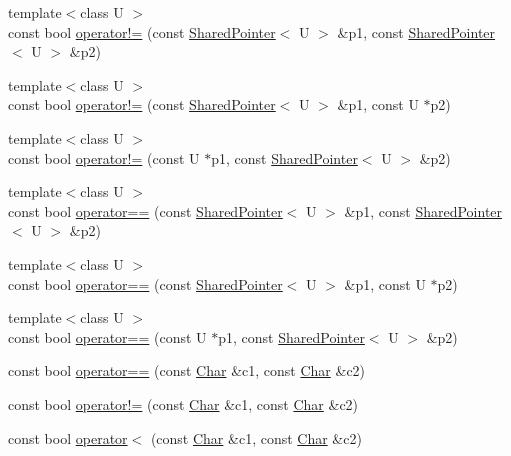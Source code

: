 \begin{DoxyCompactItemize}
\item 
{\footnotesize template$<$class U $>$ }\\const bool \hyperlink{namespaceprism_a9df924e4deb059bf1200701c8235410a}{operator!=} (const \hyperlink{classprism_1_1_shared_pointer}{Shared\+Pointer}$<$ U $>$ \&p1, const \hyperlink{classprism_1_1_shared_pointer}{Shared\+Pointer}$<$ U $>$ \&p2)
\item 
{\footnotesize template$<$class U $>$ }\\const bool \hyperlink{namespaceprism_ad6391c124e006b0e3a3ec67f55e208b0}{operator!=} (const \hyperlink{classprism_1_1_shared_pointer}{Shared\+Pointer}$<$ U $>$ \&p1, const U $\ast$p2)
\item 
{\footnotesize template$<$class U $>$ }\\const bool \hyperlink{namespaceprism_ab8792dbd5cac5678390843bacdb69daa}{operator!=} (const U $\ast$p1, const \hyperlink{classprism_1_1_shared_pointer}{Shared\+Pointer}$<$ U $>$ \&p2)
\item 
{\footnotesize template$<$class U $>$ }\\const bool \hyperlink{namespaceprism_ae53d52e8a36ec7ca58ea1731cc18f1d8}{operator==} (const \hyperlink{classprism_1_1_shared_pointer}{Shared\+Pointer}$<$ U $>$ \&p1, const \hyperlink{classprism_1_1_shared_pointer}{Shared\+Pointer}$<$ U $>$ \&p2)
\item 
{\footnotesize template$<$class U $>$ }\\const bool \hyperlink{namespaceprism_a2b73e87f080646696ed6b595a3900119}{operator==} (const \hyperlink{classprism_1_1_shared_pointer}{Shared\+Pointer}$<$ U $>$ \&p1, const U $\ast$p2)
\item 
{\footnotesize template$<$class U $>$ }\\const bool \hyperlink{namespaceprism_a1f29b22985dc0ec1fc548a551ce313ed}{operator==} (const U $\ast$p1, const \hyperlink{classprism_1_1_shared_pointer}{Shared\+Pointer}$<$ U $>$ \&p2)
\item 
const bool \hyperlink{namespaceprism_a1ba68b64a6cfdcff9e144b8c2476cddb}{operator==} (const \hyperlink{classprism_1_1_char}{Char} \&c1, const \hyperlink{classprism_1_1_char}{Char} \&c2)
\item 
const bool \hyperlink{namespaceprism_a249b6933154570d808cdd405ab1fd89b}{operator!=} (const \hyperlink{classprism_1_1_char}{Char} \&c1, const \hyperlink{classprism_1_1_char}{Char} \&c2)
\item 
const bool \hyperlink{namespaceprism_a2fc3e64ba36a16f24cb0ae387c83f35f}{operator$<$} (const \hyperlink{classprism_1_1_char}{Char} \&c1, const \hyperlink{classprism_1_1_char}{Char} \&c2)

\end{DoxyCompactItemize}
